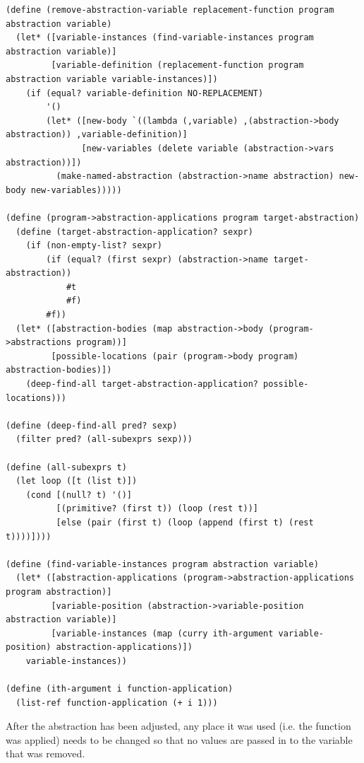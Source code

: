 \documentclass[a4paper,10pt]{article}
\begin{document}
\begin{lstlisting}[frame=trBL]
(define (remove-abstraction-variable replacement-function program abstraction variable)
  (let* ([variable-instances (find-variable-instances program abstraction variable)]
         [variable-definition (replacement-function program abstraction variable variable-instances)])
    (if (equal? variable-definition NO-REPLACEMENT)
        '()
        (let* ([new-body `((lambda (,variable) ,(abstraction->body abstraction)) ,variable-definition)]
               [new-variables (delete variable (abstraction->vars abstraction))])
          (make-named-abstraction (abstraction->name abstraction) new-body new-variables)))))

(define (program->abstraction-applications program target-abstraction)
  (define (target-abstraction-application? sexpr)
    (if (non-empty-list? sexpr)
        (if (equal? (first sexpr) (abstraction->name target-abstraction))
            #t
            #f)
        #f))
  (let* ([abstraction-bodies (map abstraction->body (program->abstractions program))]
         [possible-locations (pair (program->body program) abstraction-bodies)])
    (deep-find-all target-abstraction-application? possible-locations)))

(define (deep-find-all pred? sexp)
  (filter pred? (all-subexprs sexp)))

(define (all-subexprs t)
  (let loop ([t (list t)])
    (cond [(null? t) '()]
          [(primitive? (first t)) (loop (rest t))]
          [else (pair (first t) (loop (append (first t) (rest t))))])))

(define (find-variable-instances program abstraction variable)
  (let* ([abstraction-applications (program->abstraction-applications program abstraction)]
         [variable-position (abstraction->variable-position abstraction variable)]
         [variable-instances (map (curry ith-argument variable-position) abstraction-applications)])
    variable-instances))

(define (ith-argument i function-application)
  (list-ref function-application (+ i 1)))

\end{lstlisting}
After the abstraction has been adjusted, any place it was used (i.e. the function was applied) needs to be changed so that no values are passed in to the variable that was removed.
\end{document}
